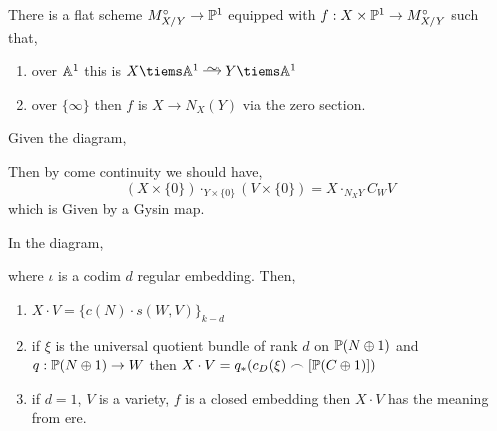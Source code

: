 \documentclass[12pt]{article}
\begin{document}
There is a flat scheme $M_{X/Y}^\circ \to \P^1$ equipped with $f : X \times \P^1 \to M^\circ_{X/Y}$ such that,
\begin{enumerate}
\item over $\A^1$ this is $X \tiems \A^1 \iso Y \tiems \A^1$
\item over $\{ \infty \}$ then $f$ is $X \to N_X(Y)$ via the zero section. 
\end{enumerate}
Given the diagram,
\begin{center}
\end{center}
Then by come continuity we should have,
\[ (X \times \{ 0 \}) \cdot_{Y \times \{ 0 \}} (V \times \{ 0 \}) = X \cdot_{N_X Y} C_W V \]
which is Given by a Gysin map. 


\begin{prop}
In the diagram,
\begin{center}
\end{center}
where $\iota$ is a codim $d$ regular embedding. Then,
\begin{enumerate}
\item $X \cdot V = \{ c(N) \cdot s(W, V) \}_{k-d}$

\item if $\xi$ is the universal quotient bundle of rank $d$ on $\P(N \oplus 1)$ and $q : \P(N \oplus 1) \to W$ then $X \cdot V = q_*(c_D(\xi) \frown [\P(C \oplus 1)])$

\item if $d = 1$, $V$ is a variety, $f$ is a closed embedding then $X \cdot V$ has the meaning from ere.
\end{enumerate}
\end{prop}
\end{document}
